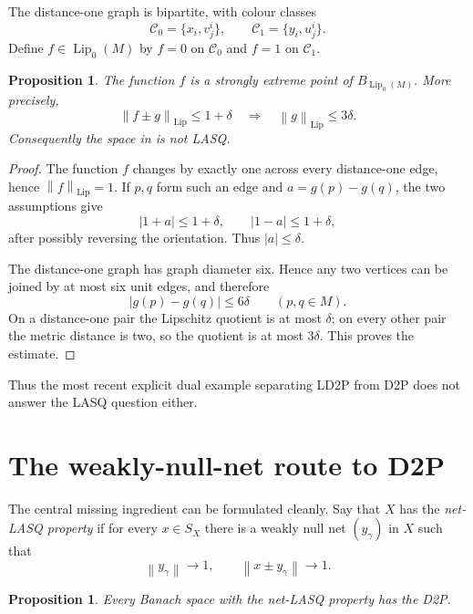 \documentclass[11pt]{article}
\newtheorem{proposition}[theorem]{Proposition}
\newcommand{\Lip}{\operatorname{Lip}}
\newcommand{\norm}[1]{\left\lVert #1\right\rVert}
\newcommand{\abs}[1]{\left\lvert #1\right\rvert}
\begin{document}
The distance-one graph is bipartite, with colour classes
\[
 \mathcal C_0=\{x_i,v_j^i\},
 \qquad
 \mathcal C_1=\{y_i,u_j^i\}.
\]
Define $f\in\Lip_0(M)$ by $f=0$ on $\mathcal C_0$ and $f=1$ on $\mathcal C_1$.

\begin{proposition}
\label{prop:lip-strong}
The function $f$ is a strongly extreme point of $B_{\Lip_0(M)}$.  More precisely,
\[
 \norm{f\pm g}_{\Lip}\le1+\delta
 \quad\Longrightarrow\quad
 \norm{g}_{\Lip}\le3\delta.
\]
Consequently the space in \cite[Example~5.2]{HallerKaasikOstrak2026} is not LASQ.
\end{proposition}

\begin{proof}
The function $f$ changes by exactly one across every distance-one edge, hence $\norm{f}_{\Lip}=1$.  If $p,q$ form such an edge and $a=g(p)-g(q)$, the two assumptions give
\[
 \abs{1+a}\le1+\delta,
 \qquad
 \abs{1-a}\le1+\delta,
\]
after possibly reversing the orientation.  Thus $\abs{a}\le\delta$.

The distance-one graph has graph diameter six.  Hence any two vertices can be joined by at most six unit edges, and therefore
\[
 \abs{g(p)-g(q)}\le6\delta
 \qquad(p,q\in M).
\]
On a distance-one pair the Lipschitz quotient is at most $\delta$; on every other pair the metric distance is two, so the quotient is at most $3\delta$.  This proves the estimate.
\end{proof}

Thus the most recent explicit dual example separating LD2P from D2P does not answer the LASQ question either.

\section{The weakly-null-net route to D2P}
\label{sec:net}

The central missing ingredient can be formulated cleanly.  Say that $X$ has the \emph{net-LASQ property} if for every $x\in S_X$ there is a weakly null net $(y_\gamma)$ in $X$ such that
\[
 \norm{y_\gamma}\to1,
 \qquad
 \norm{x\pm y_\gamma}\to1.
\]

\begin{proposition}
\label{prop:net-implies-d2p}
Every Banach space with the net-LASQ property has the D2P.
\end{proposition}
\end{document}
